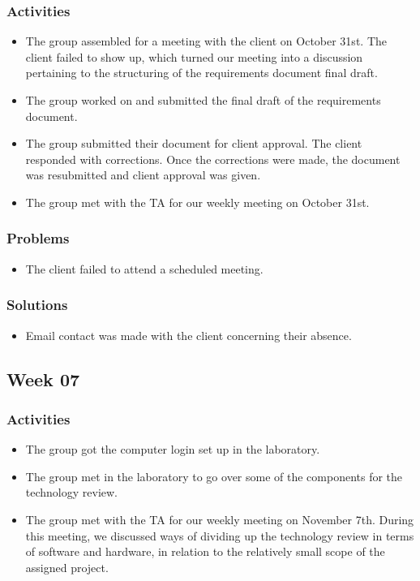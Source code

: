 \documentclass[letterpaper, onecolumn, draftclsnofoot, 10pt, compsoc]{IEEEtran}
\begin{document}
\begin{singlespace}
    	\subsubsection{Activities}
        	\begin{itemize}
            \item The group assembled for a meeting with the client on October 31st. The client failed to show up, which turned our meeting into a discussion pertaining to the structuring of the requirements document final draft. 
        	\item The group worked on and submitted the final draft of the requirements document.
            \item The group submitted their document for client approval. The client responded with corrections. Once the corrections were made, the document was resubmitted and client approval was given. 
            \item The group met with the TA for our weekly meeting on October 31st.
        	\end{itemize}
        \subsubsection{Problems}
        	\begin{itemize}
        	\item The client failed to attend a scheduled meeting. 
        	\end{itemize}
        \subsubsection{Solutions}
        	\begin{itemize}
        	\item Email contact was made with the client concerning their absence.
        	\end{itemize}
        
    \subsection{Week 07}
    	\subsubsection{Activities}
        	\begin{itemize}
        	\item The group got the computer login set up in the laboratory.
            \item The group met in the laboratory to go over some of the components for the technology review.
            \item The group met with the TA for our weekly meeting on November 7th. During this meeting, we discussed ways of dividing up the technology review in terms of software and hardware, in relation to the relatively small scope of the assigned project.
        	\end{itemize}

\end{singlespace}
\end{document}
